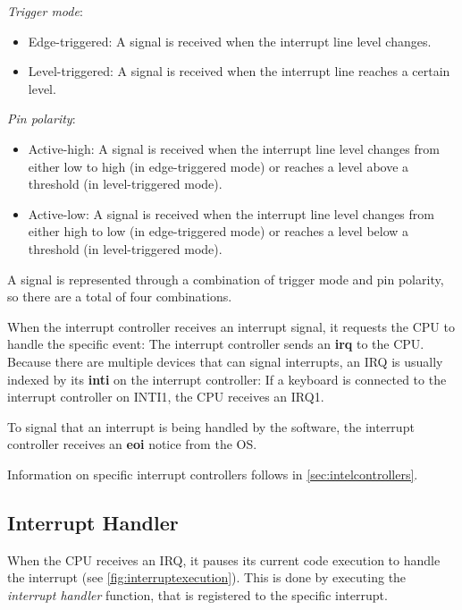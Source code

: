 \textit{Trigger mode}:

\begin{itemize}
  \item Edge-triggered: A signal is received when the interrupt line level changes.
  \item Level-triggered: A signal is received when the interrupt line reaches a certain level.
\end{itemize}

\textit{Pin polarity}:

\begin{itemize}
  \item Active-high: A signal is received when the interrupt line level changes from either low to high (in edge-triggered mode) or reaches a level above a threshold (in level-triggered mode).
  \item Active-low: A signal is received when the interrupt line level changes from either high to low (in edge-triggered mode) or reaches a level below a threshold (in level-triggered mode).
\end{itemize}

A signal is represented through a combination of trigger mode and pin polarity, so there are a total of four combinations.

When the interrupt controller receives an interrupt signal, it requests the CPU to handle the specific event: The interrupt controller sends an \textbf{\gls{irq}} to the CPU\@.
Because there are multiple devices that can signal interrupts, an IRQ is usually indexed by its \textbf{\gls{inti}} on the interrupt controller: If a keyboard is connected to the interrupt controller on INTI1, the CPU receives an IRQ1.

To signal that an interrupt is being handled by the software, the interrupt controller receives an \textbf{\gls{eoi}} notice from the OS\@.

Information on specific interrupt controllers follows in \autoref{sec:intelcontrollers}.

\subsection{Interrupt Handler}
\label{subsec:handler}

When the CPU receives an IRQ, it pauses its current code execution to handle the interrupt (see \autoref{fig:interruptexecution}).
This is done by executing the \textit{interrupt handler} function, that is registered to the specific interrupt.

